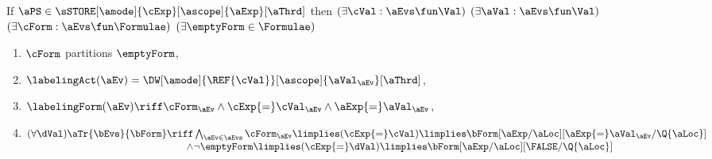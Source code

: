 \begin{definition}
  \label{def:semcaaddr}

  \noindent
  If $\aPS \in \sSTORE[\amode]{\cExp}[\ascope]{\aExp}[\aThrd]$ then
  $(\exists\cVal:\aEvs\fun\Val)$
  $(\exists\aVal:\aEvs\fun\Val)$
  $(\exists\cForm:\aEvs\fun\Formulae)$
  $(\exists\emptyForm\in\Formulae)$
  \begin{multicols}{2}
    \begin{enumerate}[topsep=0pt,label=(\textsc{w}\arabic*),ref=\textsc{w}\arabic*]
    \item \label{write-E-ca-addr}
      $\cForm$ partitions $\emptyForm$,
    \item \label{write-lambda-ca-addr}
      $\labelingAct(\aEv) = \DW[\amode]{\REF{\cVal}}[\ascope]{\aVal_\aEv}[\aThrd]$,
    \item \label{write-kappa-ca-addr}
      \begin{math}
        \labelingForm(\aEv) \riff
        \cForm_\aEv
        \land \cExp{=}\cVal_\aEv
        \land \aExp{=}\aVal_\aEv
      \end{math},      
    \item
    \begin{math}
      (\forall\dVal)
      \begin{aligned}[t]
        \aTr{\bEvs}{\bForm} \riff
        &\textstyle\bigwedge_{\aEv\in\aEvs}
        \cForm_\aEv
        \limplies (\cExp{=}\cVal)
        \limplies 
        \bForm[\aExp/\aLoc][\aExp{=}\aVal_\aEv/\Q{\aLoc}]
        \\[-.5ex]
        \land
        &
        \lnot\emptyForm
        \limplies (\cExp{=}\dVal)
        \limplies 
        \bForm[\aExp/\aLoc][\FALSE/\Q{\aLoc}]
      \end{aligned}
    \end{math}
    \columnbreak

\end{enumerate}
\end{multicols}
\end{definition}
